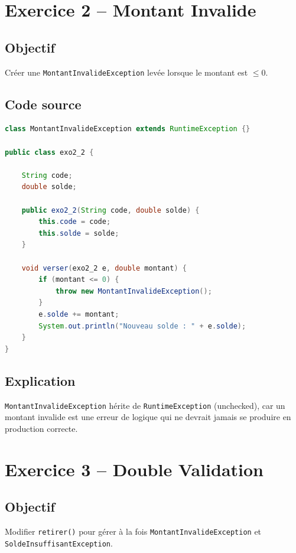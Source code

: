 \section{Exercice 2 -- Montant Invalide}

\subsection{Objectif}

Créer une \texttt{MontantInvalideException} levée lorsque le montant est $\leq 0$.

\subsection{Code source}

\begin{lstlisting}[language=Java, caption={exo2\_2.java -- MontantInvalideException}]
class MontantInvalideException extends RuntimeException {}

public class exo2_2 {

    String code;
    double solde;

    public exo2_2(String code, double solde) {
        this.code = code;
        this.solde = solde;
    }

    void verser(exo2_2 e, double montant) {
        if (montant <= 0) {
            throw new MontantInvalideException();
        }
        e.solde += montant;
        System.out.println("Nouveau solde : " + e.solde);
    }
}
\end{lstlisting}

\subsection{Explication}

\texttt{MontantInvalideException} hérite de \texttt{RuntimeException}
(unchecked), car un montant invalide est une erreur de logique qui ne devrait
jamais se produire en production correcte.

\section{Exercice 3 -- Double Validation}

\subsection{Objectif}

Modifier \texttt{retirer()} pour gérer à la fois \texttt{MontantInvalideException}
et \texttt{SoldeInsuffisantException}.

